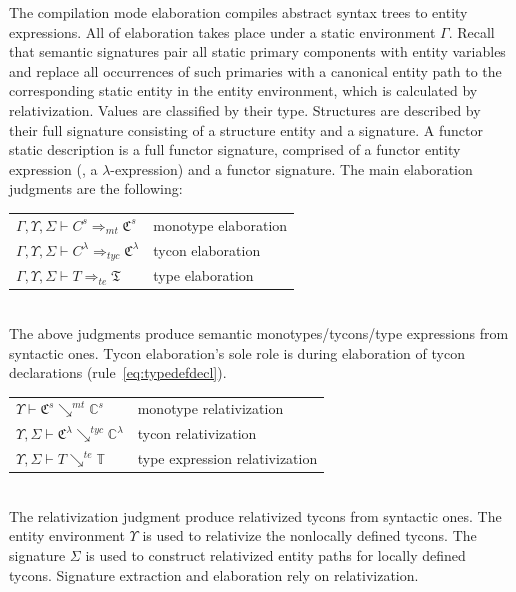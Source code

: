 \documentclass[9pt,nocopyrightspace, fleqn]{sigplanconf}
\begin{document}
The compilation mode elaboration compiles abstract
syntax trees to entity expressions. All of elaboration takes place
under a static environment $\Gamma$. Recall that semantic
signatures pair all static primary components with entity variables
and replace all occurrences of such primaries with a canonical entity path to the corresponding static entity in the entity environment, which is calculated by relativization. Values are classified by their type. Structures are described by their full signature consisting of a structure entity and a signature. A functor static description is a full functor signature, comprised of a functor entity expression (\ie, a $\lambda$-expression) and a functor signature. The main elaboration judgments are the following:\\
 
\begin{tabular}{ll}
        $\Gamma,\Upsilon,\Sigma\vdash C^s \Rightarrow_{mt} \mathfrak{C}^s$ & monotype elaboration\\
        $\Gamma,\Upsilon,\Sigma\vdash C^\lambda \Rightarrow_{tyc} \mathfrak{C}^\lambda$ & tycon elaboration\\
        $\Gamma,\Upsilon,\Sigma\vdash T \Rightarrow_{te} \mathfrak{T}$ & type elaboration\\
\end{tabular}\\

The above judgments produce semantic monotypes/tycons/type expressions from syntactic ones. Tycon elaboration's sole role is during elaboration of tycon declarations (rule~\ref{eq:typedefdecl}). 

\begin{tabular}{ll}       
        $\Upsilon\vdash \mathfrak{C}^s \searrow^{mt} \mathbb{C}^s$ & monotype relativization\\
        $\Upsilon,\Sigma\vdash \mathfrak{C}^\lambda \searrow^{tyc} \mathbb{C}^\lambda$ & tycon relativization\\
        $\Upsilon,\Sigma\vdash T \searrow^{te} \mathbb{T}$ & type expression relativization
\end{tabular}\\

The relativization judgment produce relativized tycons from syntactic ones. The entity environment $\Upsilon$ is used to relativize the nonlocally defined tycons. The signature $\Sigma$ is used to construct relativized entity paths for locally defined tycons. Signature extraction and elaboration rely on relativization. \\
\end{document}
